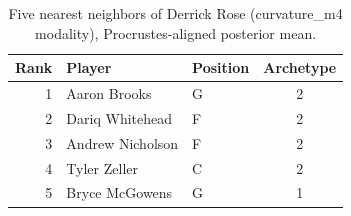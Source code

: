 \begin{table}[htbp]
  \centering\small
  \begin{tabular}{rllc}
    \toprule
    Rank & Player & Position & Archetype \\
    \midrule
    1 & Aaron Brooks & G & 2 \\
    2 & Dariq Whitehead & F & 2 \\
    3 & Andrew Nicholson & F & 2 \\
    4 & Tyler Zeller & C & 2 \\
    5 & Bryce McGowens & G & 1 \\
    \bottomrule
  \end{tabular}
  \caption{Five nearest neighbors of Derrick Rose (curvature_m4 modality), Procrustes-aligned posterior mean.}
  \label{tab:Derrick_Rose_neighbors_curvature_m4}
\end{table}

